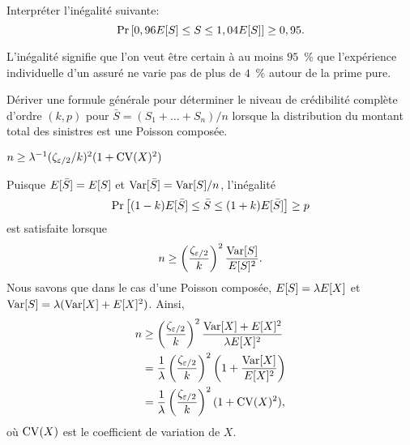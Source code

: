 \begin{exercice}
  Interpréter l'inégalité suivante:
  \begin{equation*}
    \Pr
    \left[
      0,96 E [ S ] \leq S \leq 1,04 E [ S ]
    \right]
    \geq 0,95.
  \end{equation*}
  \begin{rep}
    L'inégalité signifie que l'on veut être certain à au moins $95$~\%
    que l'expérience individuelle d'un assuré ne varie pas de plus de
    $4$~\% autour de la prime pure.
  \end{rep}
\end{exercice}

\begin{exercice}
  \label{ex:stabilite:nPC}
  Dériver une formule générale pour déterminer le niveau de
  crédibilité complète d'ordre $(k, p)$ pour $\bar{S} = (S_1 + \dots +
  S_n)/n$ lorsque la distribution du montant total des sinistres est
  une Poisson composée.
  \begin{rep}
    $n \geq \lambda^{-1} (\zeta_{\varepsilon/2}/k)^2 (1 + \operatorname{CV}(X)^2)$
  \end{rep}
  \begin{sol}
    Puisque $E [ \bar{S} ] = E [ S ]$ et $\operatorname{Var} [ \bar{S} ] = \operatorname{Var} [ S ]/n$,
    l'inégalité
    \begin{equation*}
      \Pr
      \left[
        (1 - k) E [ \bar{S} ] \leq \bar{S} \leq (1 + k) E [ \bar{S} ]
      \right]
      \geq p
    \end{equation*}
    est satisfaite lorsque
    \begin{equation*}
      n \ge
      \left( \frac{\zeta_{\varepsilon/2}}{k} \right)^2
      \frac{\operatorname{Var} [ S ]}{E [ S ]^2}.
    \end{equation*}
    Nous savons que dans le cas d'une Poisson composée,
    $E [ S ] = \lambda E [ X ]$ et
    $\operatorname{Var} [ S ] = \lambda (\operatorname{Var} [ X ] + E [ X ]^2)$. Ainsi,
    \begin{align*}
      n
      & \geq \left( \frac{\zeta_{\varepsilon/2}}{k} \right)^2
      \frac{\operatorname{Var} [ X ] + E [ X ]^2}{\lambda E [ X ]^2} \\
      &= \frac{1}{\lambda} \left( \frac{\zeta_{\varepsilon/2}}{k}
      \right)^2 \left( 1 + \frac{\operatorname{Var} [ X ]}{E [ X ]^2}
      \right) \\
      &= \frac{1}{\lambda} \left( \frac{\zeta_{\varepsilon/2}}{k}
      \right)^2 (1 + \operatorname{CV}(X)^2),
    \end{align*}
    où $\operatorname{CV}(X)$ est le coefficient de variation de $X$.
  \end{sol}
\end{exercice}

